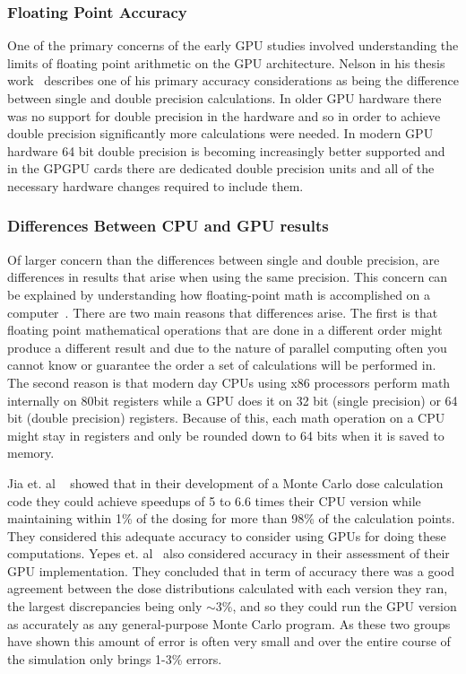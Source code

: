 \subsubsection*{\textbf{Floating Point Accuracy}}

One of the primary concerns of the early GPU studies involved understanding the limits of floating point arithmetic on the GPU architecture.
%
Nelson in his thesis work~\cite{nelson2009monte} describes one of his primary accuracy considerations as being the difference between single and double precision calculations.
%
In older GPU hardware there was no support for double precision in the hardware and so in order to achieve double precision significantly more calculations were needed.
%
In modern GPU hardware 64 bit double precision is becoming increasingly better supported and in the GPGPU cards there are dedicated double precision units and all of the necessary hardware changes required to include them.
%

\subsubsection*{\textbf{Differences Between CPU and GPU results}}

Of larger concern than the differences between single and double precision, are differences in results that arise when using the same precision.
%
This concern can be explained by understanding how floating-point math is accomplished on a computer~\cite{goldberg1991every}.
%
There are two main reasons that differences arise.
%
The first is that floating point mathematical operations that are done in a different order might produce a different result and due to the nature of parallel computing often you cannot know or guarantee the order a set of calculations will be performed in.
%
The second reason is that modern day CPUs using x86 processors perform math internally on 80bit registers while a GPU does it on 32 bit (single precision) or 64 bit (double precision) registers.
%
Because of this, each math operation on a CPU might stay in registers and only be rounded down to 64 bits when it is saved to memory.
%

%
Jia et. al ~\cite{jia2010development} showed that in their development of a Monte Carlo dose calculation code they could achieve speedups of 5 to 6.6 times their CPU version while maintaining within 1\% of the dosing for more than 98\% of the calculation points.
%
They considered this adequate accuracy to consider using GPUs for doing these computations.
%
Yepes et. al~\cite{yepes2010gpu} also considered accuracy in their assessment of their GPU implementation.
%
They concluded that in term of accuracy there was a good agreement between the dose distributions calculated with each version they ran, the largest discrepancies being only $\sim$3\%, and so they could run the GPU version as accurately as any general-purpose Monte Carlo program.
%
As these two groups have shown this amount of error is often very small and over the entire course of the simulation only brings 1-3\% errors.

